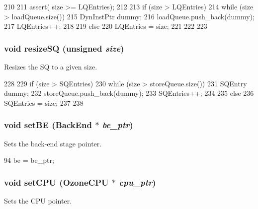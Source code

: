 \begin{DoxyCode}
210 {
211     assert( size >= LQEntries);
212 
213     if (size > LQEntries) {
214         while (size > loadQueue.size()) {
215             DynInstPtr dummy;
216             loadQueue.push_back(dummy);
217             LQEntries++;
218         }
219     } else {
220         LQEntries = size;
221     }
222 
223 }
\end{DoxyCode}
\hypertarget{classOzoneLWLSQ_a341dd6a3bd8d240659fd9d698c3b5c65}{
\subsubsection[{resizeSQ}]{\setlength{\rightskip}{0pt plus 5cm}void resizeSQ (unsigned {\em size})}}
\label{classOzoneLWLSQ_a341dd6a3bd8d240659fd9d698c3b5c65}
Resizes the SQ to a given size. 


\begin{DoxyCode}
228 {
229     if (size > SQEntries) {
230         while (size > storeQueue.size()) {
231             SQEntry dummy;
232             storeQueue.push_back(dummy);
233             SQEntries++;
234         }
235     } else {
236         SQEntries = size;
237     }
238 }
\end{DoxyCode}
\hypertarget{classOzoneLWLSQ_a9134276ed85820d74779ad5826580822}{
\subsubsection[{setBE}]{\setlength{\rightskip}{0pt plus 5cm}void setBE ({\bf BackEnd} $\ast$ {\em be\_\-ptr})}}
\label{classOzoneLWLSQ_a9134276ed85820d74779ad5826580822}
Sets the back-\/end stage pointer. 


\begin{DoxyCode}
94     { be = be_ptr; }
\end{DoxyCode}
\hypertarget{classOzoneLWLSQ_ab8056057b67b41f234f56940cc115cc1}{
\subsubsection[{setCPU}]{\setlength{\rightskip}{0pt plus 5cm}void setCPU ({\bf OzoneCPU} $\ast$ {\em cpu\_\-ptr})}}
\label{classOzoneLWLSQ_ab8056057b67b41f234f56940cc115cc1}
Sets the CPU pointer. 


